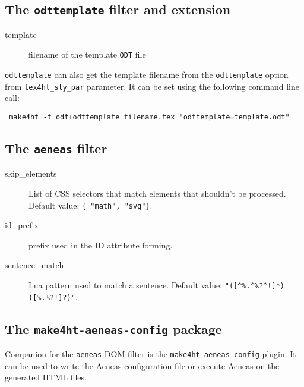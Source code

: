 \hypertarget{the-odttemplate-filter-and-extension}{%
\subsection{\texorpdfstring{The \texttt{odttemplate} filter and
extension}{The odttemplate filter and extension}}\label{the-odttemplate-filter-and-extension}}

\begin{description}
\item[template]
filename of the template \texttt{ODT} file
\end{description}

\texttt{odttemplate} can also get the template filename from the
\texttt{odttemplate} option from \texttt{tex4ht\_sty\_par} parameter. It
can be set using the following command line call:

\begin{verbatim}
 make4ht -f odt+odttemplate filename.tex "odttemplate=template.odt"
\end{verbatim}

\hypertarget{the-aeneas-filter}{%
\subsection{\texorpdfstring{The \texttt{aeneas}
filter}{The aeneas filter}}\label{the-aeneas-filter}}

\begin{description}
\item[skip\_elements]
List of CSS selectors that match elements that shouldn't be processed.
Default value: \texttt{\{\ "math",\ "svg"\}}.
\item[id\_prefix]
prefix used in the ID attribute forming.
\item[sentence\_match]
Lua pattern used to match a sentence. Default value:
\texttt{"({[}\^{}\%.\^{}\%?\^{}!{]}*)({[}\%.\%?!{]}?)"}.
\end{description}

\hypertarget{the-make4ht-aeneas-config-package}{%
\subsection{\texorpdfstring{The \texttt{make4ht-aeneas-config}
package}{The make4ht-aeneas-config package}}\label{the-make4ht-aeneas-config-package}}

Companion for the \texttt{aeneas} DOM filter is the
\texttt{make4ht-aeneas-config} plugin. It can be used to write the
Aeneas configuration file or execute Aeneas on the generated HTML files.

